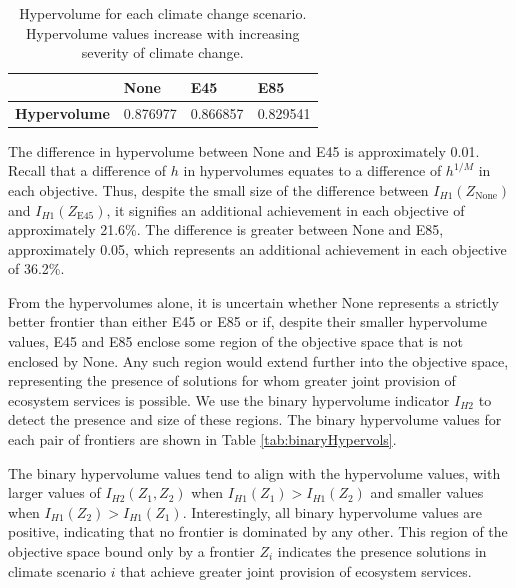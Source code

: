 \begin{table}[]
\centering
\caption[Hypervolumes of the efficient frontiers]{Hypervolume for each climate change scenario. Hypervolume values increase with increasing severity of climate change.}
\label{tab:hypervols}
\begin{tabular}{lllll}
\multicolumn{2}{l|}{}                                                  & \textbf{None} & \textbf{E45} & \textbf{E85} \\ \hline
\multicolumn{2}{l|}{\textbf{Hypervolume}}                              & 0.876977      & 0.866857     & 0.829541       
\end{tabular}
\end{table}

The difference in hypervolume between None and E45 is approximately 0.01. Recall that a difference of $h$ in hypervolumes equates to a difference of $h^{1/M}$ in each objective. Thus, despite the small size of the difference between $I_{H1}(Z_\text{None})$ and $I_{H1}(Z_\text{E45})$, it signifies an additional achievement in each objective of approximately 21.6\%. The difference is greater between None and E85, approximately 0.05, which represents an additional achievement in each objective of 36.2\%.

From the hypervolumes alone, it is uncertain whether None represents a strictly better frontier than either E45 or E85 or if, despite their smaller hypervolume values, E45 and E85 enclose some region of the objective space that is not enclosed by None. Any such region would extend further into the objective space, representing the presence of solutions for whom greater joint provision of ecosystem services is possible. We use the binary hypervolume indicator $I_{H2}$ to detect the presence and size of these regions. The binary hypervolume values for each pair of frontiers are shown in Table \ref{tab:binaryHypervols}.

The binary hypervolume values tend to align with the hypervolume values, with larger values of $I_{H2}(Z_1,Z_2)$ when $I_{H1}(Z_1) > I_{H1}(Z_2)$ and smaller values when $I_{H1}(Z_2) > I_{H1}(Z_1)$. Interestingly, all binary hypervolume values are positive, indicating that no frontier is dominated by any other. This region of the objective space bound only by a frontier $Z_i$ indicates the presence solutions in climate scenario $i$ that achieve greater joint provision of ecosystem services.%

